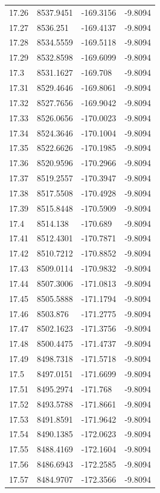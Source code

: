 \begin{table}[H]
\begin{tabular}{llll}
17.26 & 8537.9451 & -169.3156 & -9.8094 \\
17.27 & 8536.251 & -169.4137 & -9.8094 \\
17.28 & 8534.5559 & -169.5118 & -9.8094 \\
17.29 & 8532.8598 & -169.6099 & -9.8094 \\
17.3 & 8531.1627 & -169.708 & -9.8094 \\
17.31 & 8529.4646 & -169.8061 & -9.8094 \\
17.32 & 8527.7656 & -169.9042 & -9.8094 \\
17.33 & 8526.0656 & -170.0023 & -9.8094 \\
17.34 & 8524.3646 & -170.1004 & -9.8094 \\
17.35 & 8522.6626 & -170.1985 & -9.8094 \\
17.36 & 8520.9596 & -170.2966 & -9.8094 \\
17.37 & 8519.2557 & -170.3947 & -9.8094 \\
17.38 & 8517.5508 & -170.4928 & -9.8094 \\
17.39 & 8515.8448 & -170.5909 & -9.8094 \\
17.4 & 8514.138 & -170.689 & -9.8094 \\
17.41 & 8512.4301 & -170.7871 & -9.8094 \\
17.42 & 8510.7212 & -170.8852 & -9.8094 \\
17.43 & 8509.0114 & -170.9832 & -9.8094 \\
17.44 & 8507.3006 & -171.0813 & -9.8094 \\
17.45 & 8505.5888 & -171.1794 & -9.8094 \\
17.46 & 8503.876 & -171.2775 & -9.8094 \\
17.47 & 8502.1623 & -171.3756 & -9.8094 \\
17.48 & 8500.4475 & -171.4737 & -9.8094 \\
17.49 & 8498.7318 & -171.5718 & -9.8094 \\
17.5 & 8497.0151 & -171.6699 & -9.8094 \\
17.51 & 8495.2974 & -171.768 & -9.8094 \\
17.52 & 8493.5788 & -171.8661 & -9.8094 \\
17.53 & 8491.8591 & -171.9642 & -9.8094 \\
17.54 & 8490.1385 & -172.0623 & -9.8094 \\
17.55 & 8488.4169 & -172.1604 & -9.8094 \\
17.56 & 8486.6943 & -172.2585 & -9.8094 \\
17.57 & 8484.9707 & -172.3566 & -9.8094 \\

\end{tabular}
\end{table}
